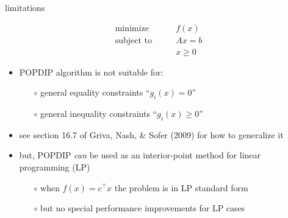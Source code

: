 \documentclass[10pt,hyperref]{beamer}
\begin{document}
\begin{frame}{limitations}

\begin{equation*}
\begin{matrix}
\text{minimize} \qquad   & f(x) \\
\text{subject to} \qquad & A x = b \\
                         & x \ge 0
\end{matrix}
\end{equation*}

\vspace{10mm}

\begin{itemize}
\item POPDIP algorithm is not suitable for:
    \begin{itemize}
    \item[$\circ$] general equality constraints ``$g_i(x)=0$''
    \item[$\circ$] general inequality constraints ``$g_i(x)\ge 0$''
    \end{itemize}
\item see section 16.7 of Griva, Nash, \& Sofer (2009) for how to generalize it
\item but, POPDIP \emph{can} be used as an interior-point method for linear programming (LP)
    \begin{itemize}
    \item[$\circ$] when $f(x)=c^\top x$ the problem is in LP standard form
    \item[$\circ$] but no special performance improvements for LP cases
    \end{itemize}
\end{itemize}
\end{frame}
\end{document}
